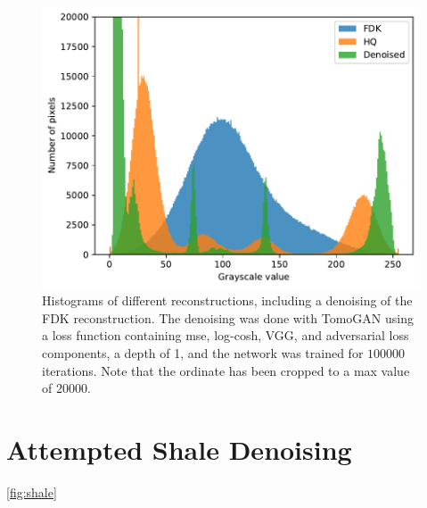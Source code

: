 \begin{figure}[htbp]
  \centering
  \includegraphics[width=.85\textwidth]{figures/kimroberthist.pdf}
  \caption[Histogram]{Histograms of different reconstructions, including a denoising of the FDK reconstruction. The denoising was done with TomoGAN using a loss function containing \acrshort{mse}, log-cosh, VGG, and adversarial loss components, a depth of 1, and the network was trained for $100 000$ iterations. Note that the ordinate has been cropped to a max value of $20000$. }
  \label{fig:kimroberthist}
\end{figure}

\section{Attempted Shale Denoising}
\cref{fig:shale}

